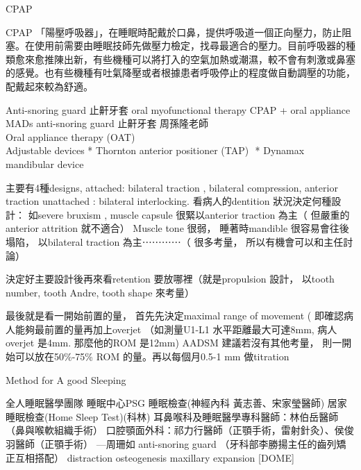 \documentclass[aspectratio=169]{beamer}
\begin{document}
\begin{frame}{CPAP}
    \begin{block}{CPAP}
    「陽壓呼吸器」，在睡眠時配戴於口鼻，提供呼吸道一個正向壓力，防止阻塞。在使用前需要由睡眠技師先做壓力檢定，找尋最適合的壓力。目前呼吸器的種類愈來愈推陳出新，有些機種可以將打入的空氣加熱或潮濕，較不會有刺激或鼻塞的感覺。也有些機種有吐氣降壓或者根據患者呼吸停止的程度做自動調壓的功能，配戴起來較為舒適。
    \end{block}
\end{frame}

\begin{frame}{Anti-snoring guard 止鼾牙套}
oral myofunctional therapy
CPAP + oral appliance MADs
    anti-snoring guard 止鼾牙套 周孫隆老師\\
    Oral appliance therapy (OAT)\\
Adjustable devices
* Thornton anterior positioner (TAP) 
* Dynamax mandibular device

    主要有4種designs, 
attached: bilateral traction , bilateral compression, anterior traction 
unattached : bilateral interlocking. 
看病人的dentition 狀況決定何種設計： 如severe bruxism , muscle capsule 很緊以anterior traction 為主（ 但嚴重的anterior attrition 就不適合） 
Muscle tone 很弱， 睡著時mandible 很容易會往後塌陷， 以bilateral traction 為主⋯⋯⋯⋯（ 很多考量， 所以有機會可以和主任討論） 

決定好主要設計後再來看retention 要放哪裡（就是propulsion 設計， 以tooth number, tooth Andre, tooth shape 來考量） 

最後就是看一開始前置的量， 首先先決定maximal range of movement ( 即確認病人能夠最前置的量再加上overjet （如測量U1-L1 水平距離最大可達8mm, 病人overjet 是4mm. 那麼他的ROM 是12mm) 
AADSM 建議若沒有其他考量， 則一開始可以放在50\%-75\% ROM 的量。再以每個月0.5-1 mm 做titration
\end{frame}


\begin{frame}{Method for A good Sleeping}
\begin{block}{全人睡眠醫學團隊}
睡眠中心PSG 睡眠檢查(神經內科 黃志善、宋家瑩醫師)
居家睡眠檢查(Home Sleep Test)(科林)
耳鼻喉科及睡眠醫學專科醫師：林伯岳醫師（鼻與喉軟組織手術）
口腔顎面外科：祁力行醫師（正顎手術，雷射針灸）、侯俊羽醫師（正顎手術）
—周珊如 anti-snoring guard
（牙科部李勝揚主任的齒列矯正互相搭配）
distraction osteogenesis maxillary expansion [DOME]
~~\\
\end{block}
\end{frame}
\end{document}
